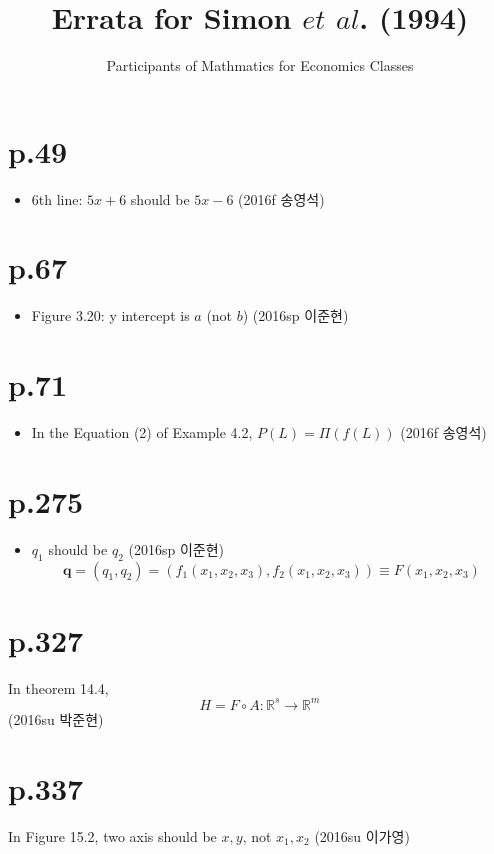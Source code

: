 \documentclass[a4paper]{article}
\title{Errata for Simon $et$ $al$. (1994)}
\author{Participants of Mathmatics for Economics Classes}
\begin{document}
\maketitle

\section{p.49} %
\label{sec:p49}
\begin{itemize}
	\item 6th line: $5x+6$ should be $5x-6$ (2016f 송영석)
\end{itemize}

\section{p.67} %
\label{sec:p67}
\begin{itemize}
	\item Figure 3.20: y intercept is $a$ (not $b$) (2016sp 이준현)
\end{itemize}

\section{p.71} %
\label{sec:p_71}
\begin{itemize}
	\item In the Equation (2) of Example 4.2, $P(L) = \Pi(f(L))$ (2016f 송영석)
\end{itemize}

\section{p.275} %
\label{sec:p_275}
\begin{itemize}
	\item $q_1$ should be $q_2$ (2016sp 이준현)
	\[
		\mathbf{q}=(q_1,q_2)=\left(f_1(x_1,x_2,x_3),f_2(x_1,x_2,x_3)\right)\equiv F(x_1,x_2,x_3)
	\]
\end{itemize}

\section{p.327} %
\label{sec:p_327}
In theorem 14.4, 
\[
	H = F \circ A : \mathbb{R}^s \rightarrow \mathbb{R}^m
\]
(2016su 박준현)

\section{p.337} %
\label{sec:p_337}
In Figure 15.2, two axis should be $x,y$, not $x_1, x_2$ (2016su 이가영)
\end{document}
